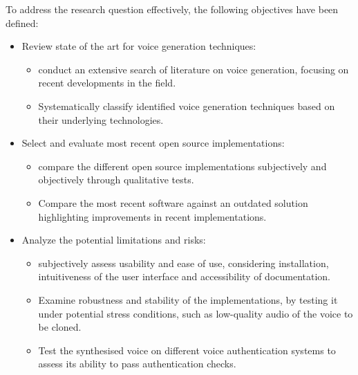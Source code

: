 To address the research question effectively, the following objectives have been defined:
\begin{itemize}
    \item Review state of the art for voice generation techniques:
    \begin{itemize}
        \item conduct an extensive search of literature on voice generation, focusing on recent developments in the field.
        \item Systematically classify identified voice generation techniques based on their underlying technologies. 
    \end{itemize}
    \item Select and evaluate most recent open source implementations:
    \begin{itemize}
        \item compare the different open source implementations subjectively and objectively through qualitative tests. 
        \item Compare the most recent software against an outdated solution highlighting improvements in recent implementations.
    \end{itemize}
    \item Analyze the potential limitations and risks:
    \begin{itemize}
        \item subjectively assess usability and ease of use, considering installation, intuitiveness of the user interface and accessibility of documentation.
        \item Examine robustness and stability of the implementations, by testing it under potential stress conditions, such as low-quality audio of the voice to be cloned.
        \item Test the synthesised voice on different voice authentication systems to assess its ability to pass authentication checks.
    \end{itemize}
\end{itemize}
